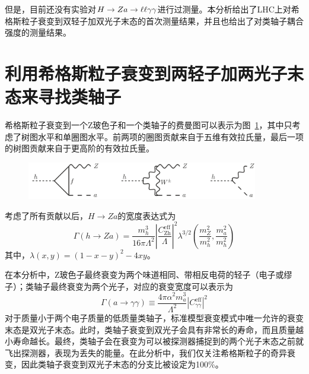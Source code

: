 但是，目前还没有实验对$H\to Za\to\ell\ell\gamma\gamma$进行过测量。本分析给出了LHC上对希格斯粒子衰变到双轻子加双光子末态的首次测量结果，并且也给出了对类轴子耦合强度的测量结果。

\section{利用希格斯粒子衰变到两轻子加两光子末态来寻找类轴子}

希格斯粒子衰变到一个Z玻色子和一个类轴子的费曼图可以表示为图~\ref{fig:c01f05}，其中只考虑了树图水平和单圈图水平。前两项的圈图贡献来自于五维有效拉氏量，最后一项的树图贡献来自于更高阶的有效拉氏量。

\begin{figure}[!htbp]
    \centering
    \includegraphics[width=0.9\textwidth]{figures/chapter01/ALP_feynman.jpg}
    \label{fig:c01f05}
\end{figure}

考虑了所有贡献以后，$H\rightarrow Za$的宽度表达式为
\begin{equation}\label{eq:1-18}
    \Gamma(h \rightarrow Z a)=\frac{m_{h}^{3}}{16 \pi \Lambda^{2}}\left|\frac{C_{\mathrm{Zh}}^{\mathrm{eff}}}{\Lambda}\right|^{2} \lambda^{3 / 2}\left(\frac{m_{Z}^{2}}{m_{h}^{2}}, \frac{m_{a}^{2}}{m_{h}^{2}}\right)
\end{equation}
其中，$\lambda(x,y) = (1-x-y)^2 -4xy$。

在本分析中，Z玻色子最终衰变为两个味道相同、带相反电荷的轻子（电子或缪子）；类轴子最终衰变为两个光子，对应的衰变宽度可以表示为
\begin{equation}\label{eq:1-19}
    \Gamma(a \rightarrow \gamma \gamma) \equiv \frac{4 \pi \alpha^{2} m_{a}^{3}}{\Lambda^{2}}\left|C_{\gamma \gamma}^{\mathrm{eff}}\right|^{2}
\end{equation}
对于质量小于两个电子质量的低质量类轴子，标准模型衰变模式中唯一允许的衰变末态是双光子末态。此时，类轴子衰变到双光子会具有非常长的寿命，而且质量越小寿命越长。最终，类轴子会在衰变为可以被探测器捕捉到的两个光子末态之前就飞出探测器，表现为丢失的能量。在此分析中，我们仅关注希格斯粒子的奇异衰变，因此类轴子衰变到双光子末态的分支比被设定为100\%。

